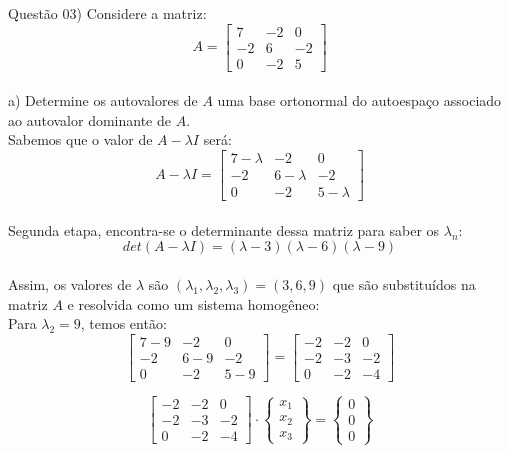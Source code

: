 
\noindent \textcolor{COLOR1}{Questão 03)} Considere a matriz:
\\

\[A=
    \begin{bmatrix}
        7  & -2 & 0  \\
        -2 & 6  & -2 \\
        0  & -2 & 5
    \end{bmatrix}
\]\\

a) Determine os autovalores de $A$ uma base ortonormal do autoespaço associado ao autovalor dominante de $A$.\\

Sabemos que o valor de $A-\lambda I$ será:\\

\[
    A-\lambda I =
    \begin{bmatrix}
        7-\lambda & -2        & 0         \\
        -2        & 6-\lambda & -2        \\
        0         & -2        & 5-\lambda
    \end{bmatrix}
\]\\

Segunda etapa, encontra-se o determinante dessa matriz para saber os $\lambda_n$:\\

\[
    det(A-\lambda I) = (\lambda-3)(\lambda-6)(\lambda-9)
\]\\

Assim, os valores de $\lambda$ são $(\lambda_1, \lambda_2, \lambda_3)=(3,6,9)$ que são substituídos na matriz $A$ e resolvida como um sistema homogêneo:\\

Para $\lambda_2=9$, temos então:\\

\[
    \begin{bmatrix}
        7-9 & -2  & 0   \\
        -2  & 6-9 & -2  \\
        0   & -2  & 5-9
    \end{bmatrix} = \begin{bmatrix}
        -2 & -2 & 0  \\
        -2 & -3 & -2 \\
        0  & -2 & -4
    \end{bmatrix}
\]

\[
    \begin{bmatrix}
        -2 & -2 & 0  \\
        -2 & -3 & -2 \\
        0  & -2 & -4
    \end{bmatrix}\cdot\begin{Bmatrix}
        x_1 \\
        x_2 \\
        x_3
    \end{Bmatrix} = \begin{Bmatrix}
        0 \\
        0 \\
        0
    \end{Bmatrix}
\]\\

